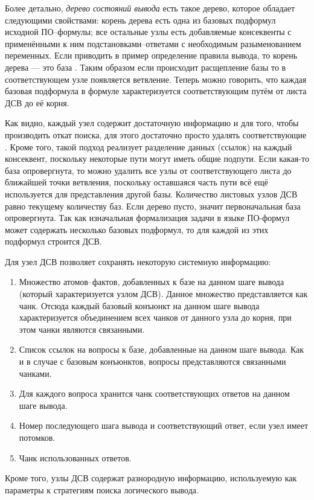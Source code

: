Более детально, \emph{дерево состояний вывода} есть такое дерево, которое обладает следующими свойствами: корень дерева есть одна из базовых подформул исходной ПО--формулы; все остальные узлы есть добавляемые консеквенты с применёнными к ним подстановками--ответами с необходимым разыменованием переменных. Если приводить в пример определение правила вывода, то корень дерева --- это база . Таким образом если происходит расщепление базы то в соответствующем узле появляется ветвление. Теперь можно говорить, что каждая базовая подформула в формуле характеризуется соответствующим путём от листа ДСВ до её корня.

Как видно, каждый узел содержит достаточную информацию и для того, чтобы производить откат поиска, для этого достаточно просто удалять соответствующие . Кроме того, такой подход реализует разделение данных (ссылок) на каждый консеквент, поскольку некоторые пути могут иметь общие подпути. Если какая-то база опровергнута, то можно удалить все узлы от соответствующего листа до ближайшей точки ветвления, поскольку оставшаяся часть пути всё ещё используется для представления другой базы. Количество листовых узлов ДСВ равно текущему количеству баз. Если дерево пусто, значит первоначальная база опровергнута. Так как изначальная формализация задачи в языке ПО-формул может содержать несколько базовых подформул, то для каждой из этих подформул строится  ДСВ.

Для  узел ДСВ позволяет сохранять некоторую системную информацию:
\begin{enumerate}
\item Множество атомов--фактов, добавленных к базе на данном шаге вывода (который характеризуется узлом ДСВ). Данное множество представляется как чанк. Отсюда каждый базовый конъюнкт на данном шаге вывода характеризуется объединением всех чанков от данного узла до корня, при этом чанки являются связанными.
\item Список ссылок на вопросы к базе, добавленные на данном шаге вывода. Как и в случае с базовым конъюнктов, вопросы представляются связанными чанками.
\item Для каждого вопроса хранится чанк соответствующих ответов на данном шаге вывода.
\item Номер последующего шага вывода и соответствующий ответ, если узел имеет потомков.
\item Чанк использованных ответов.
\end{enumerate}
Кроме того, узлы ДСВ содержат разнородную информацию, используемую как параметры к стратегиям поиска логического вывода.

